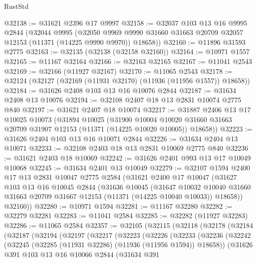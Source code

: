 \begin{lexlean}{RustStd}
\begin{coremodule}
@32138 := @31621 @2396 @17 @9997
@32158 := @32037
    @103
    @13
    @16
    @9995
    @2844
    (@32044
      @9995
      (@32050 @9969 @9990 @31660 @31663 @20709 @32057 @12153 (@11371 (@14225 @9990 @9970)) @18658))
@32160 := @11896 @31593 @2775
@32163 := @32135 (@32138 (@32158 @32160))
@32164 := @10971 @1557
@32165 := @11167 @32164
@32166 := @32163 @32165
@32167 := @11041 @2543
@32169 := @32166 (@11927 @32167)
@32170 := @11065 @2543
@32178 := @32124 (@32127 (@32169 (@11931 @32170) (@11936 (@11956 @1557)) @18658))
@32184 := @31626 @2408 @103 @13 @16 @10076 @2844
@32187 := @31634 @2408 @13 @10076
@32194 := @32108 @2407 @18 @13 @2831 @10074 @2775 @840
@32197 := @31621 @2407 @18 @10074
@32217 := @31887
    @2406
    @13
    @17
    @10025
    @10073
    (@31894
      @10025
      (@31900
        @10004
        @10020
        @31660
        @31663
        @20709
        @31907
        @12153
        (@11371 (@14225 @10020 @10005))
        @18658))
@32223 := @31626 @2404 @103 @13 @16 @10071 @2844
@32226 := @31634 @2404 @13 @10071
@32233 := @32108 @2403 @18 @13 @2831 @10069 @2775 @840
@32236 := @31621 @2403 @18 @10069
@32242 := @31626 @2401 @993 @13 @17 @10049 @10068
@32245 := @31634 @2401 @13 @10049
@32279 := @32107
    @1594
    @2400
    @17
    @13
    @2831
    @10047
    @2775
    @2584
    (@31621
      @2400
      @17
      @10047
      (@31627
        @103
        @13
        @16
        @10045
        @2844
        (@31636
          @10045
          (@31647
            @10032
            @10040
            @31660
            @31663
            @20709
            @31667
            @12153
            (@11371 (@14225 @10040 @10033))
            @18658))
        @32160))
@32280 := @10971 @1594
@32281 := @11167 @32280
@32282 := @32279 @32281
@32283 := @11041 @2584
@32285 := @32282 (@11927 @32283)
@32286 := @11065 @2584
@32357 := @32105
    (@32115
      (@32118
        (@32178
          (@32184
            (@32187
              (@32194
                (@32197
                  (@32217
                    (@32223
                      (@32226
                        (@32233
                          (@32236
                            (@32242
                              (@32245 (@32285 (@11931 @32286) (@11936 (@11956 @1594)) @18658))
                              (@31626
                                @391
                                @103
                                @13
                                @16
                                @10066
                                @2844
                                (@31634
                                  @391

\end{coremodule}
\end{lexlean}
